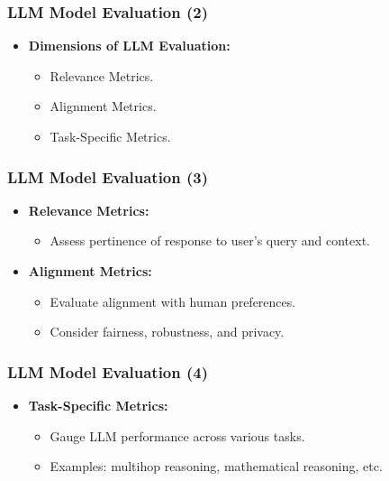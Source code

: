 \begin{frame}[fragile]\frametitle{LLM Model Evaluation (2)}
  \begin{itemize}
    \item \textbf{Dimensions of LLM Evaluation:}
      \begin{itemize}
        \item Relevance Metrics.
        \item Alignment Metrics.
        \item Task-Specific Metrics.
      \end{itemize}
  \end{itemize}
\end{frame}

\begin{frame}[fragile]\frametitle{LLM Model Evaluation (3)}
  \begin{itemize}
    \item \textbf{Relevance Metrics:}
      \begin{itemize}
        \item Assess pertinence of response to user's query and context.
      \end{itemize}
    \item \textbf{Alignment Metrics:}
      \begin{itemize}
        \item Evaluate alignment with human preferences.
        \item Consider fairness, robustness, and privacy.
      \end{itemize}
  \end{itemize}
\end{frame}

\begin{frame}[fragile]\frametitle{LLM Model Evaluation (4)}
  \begin{itemize}
    \item \textbf{Task-Specific Metrics:}
      \begin{itemize}
        \item Gauge LLM performance across various tasks.
        \item Examples: multihop reasoning, mathematical reasoning, etc.
      \end{itemize}
  \end{itemize}
\end{frame}

